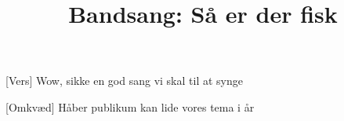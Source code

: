 \documentclass[a4paper,11pt]{article}
\title{Bandsang: Så er der fisk}
\begin{document}
\maketitle

\begin{song}
[Vers] Wow, sikke en god sang vi skal til at synge

[Omkvæd] Håber publikum kan lide vores tema i år
\end{song}
\end{document}

